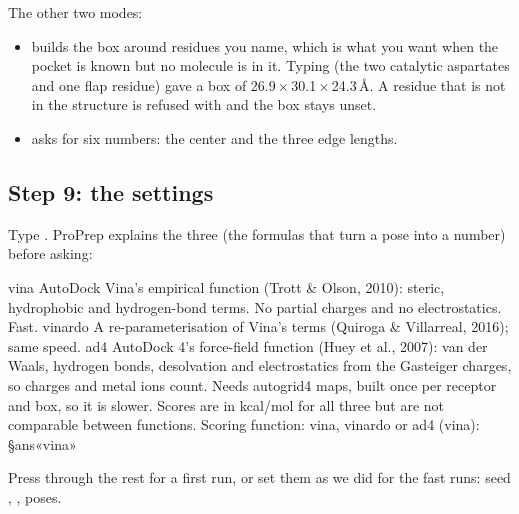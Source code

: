 The other two modes:

\begin{itemize}
  \item {} builds the box around residues you name, which is what you
        want when the pocket is known but no molecule is in it. Typing
         (the two catalytic aspartates and one flap
        residue) gave a box of
        26.9\,$\times$\,30.1\,$\times$\,24.3\,\AA. A residue that is not in
        the structure is refused with 
        and the box stays unset.
  \item {} asks for six numbers: the center and the three edge lengths.
\end{itemize}

\subsection{Step 9: the settings}

\begin{steps}
  \item Type . ProPrep explains the three 
        (the formulas that turn a pose into a number) before asking:
\begin{screen}
  vina     AutoDock Vina's empirical function (Trott & Olson, 2010): steric,
           hydrophobic and hydrogen-bond terms. No partial charges and no
           electrostatics. Fast.
  vinardo  A re-parameterisation of Vina's terms (Quiroga & Villarreal,
           2016); same speed.
  ad4      AutoDock 4's force-field function (Huey et al., 2007): van der
           Waals, hydrogen bonds, desolvation and electrostatics from the
           Gasteiger charges, so charges and metal ions count. Needs
           autogrid4 maps, built once per receptor and box, so it is slower.
  Scores are in kcal/mol for all three but are not comparable between
  functions.
Scoring function: vina, vinardo or ad4 (vina): §ans«vina»
\end{screen}
  \item Press  through the rest for a first run, or set them as we
        did for the fast runs: seed , 
        ,  poses.
\end{steps}


